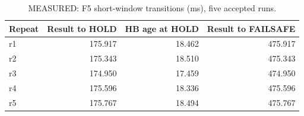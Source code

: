 \begin{table}[H]
\centering\small
\caption{MEASURED: F5 short-window transitions (ms), five accepted runs.}\label{tab:f5}
\begin{tabular}{lrrr}
\toprule
Repeat & Result to HOLD & HB age at HOLD & Result to FAILSAFE \\
\midrule
r1 & 175.917 & 18.462 & 475.917 \\
r2 & 175.343 & 18.510 & 475.343 \\
r3 & 174.950 & 17.459 & 474.950 \\
r4 & 175.596 & 18.336 & 475.596 \\
r5 & 175.767 & 18.494 & 475.767 \\
\bottomrule
\end{tabular}
\end{table}

